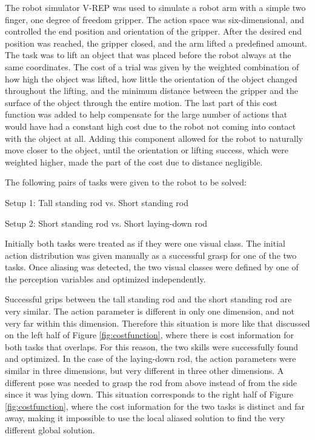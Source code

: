 \documentclass[12pt]{article}
\begin{document}
The robot simulator V-REP was used to simulate a robot arm with a simple two finger, one degree of freedom gripper. The action space was six-dimensional, and controlled the end position and orientation of the gripper. After the desired end position was reached, the gripper closed, and the arm lifted a predefined amount. The task was to lift an object that was placed before the robot always at the same coordinates. The cost of a trial was given by the weighted combination of how high the object was lifted, how little the orientation of the object changed throughout the lifting, and the minimum distance between the gripper and the surface of the object through the entire motion. The last part of this cost function was added to help compensate for the large number of actions that would have had a constant high cost due to the robot not coming into contact with the object at all. Adding this component allowed for the robot to naturally move closer to the object, until the orientation or lifting success, which were weighted higher, made the part of the cost due to distance negligible. 

	The following pairs of tasks were given to the robot to be solved:
	
Setup 1:	Tall standing rod	vs.	Short standing rod

Setup 2:	Short standing rod	vs. 	Short laying-down rod

	Initially both tasks were treated as if they were one visual class. The initial action distribution was given manually as a successful grasp for one of the two tasks. Once aliasing was detected, the two visual classes were defined by one of the perception variables and optimized independently.
	
Successful grips between the tall standing rod and the short standing rod are very similar. The action parameter is different in only one dimension, and not very far within this dimension. Therefore this situation is more like that discussed on the left half of Figure \ref{fig:costfunction}, where there is cost information for both tasks that overlaps. For this reason, the two skills were successfully found and optimized. In the case of the laying-down rod, the action parameters were similar in three dimensions, but very different in three other dimensions. A different pose was needed to grasp the rod from above instead of from the side since it was lying down. This situation corresponds to the right half of Figure \ref{fig:costfunction}, where the cost information for the two tasks is distinct and far away, making it impossible to use the local aliased solution to find the very different global solution.
\end{document}

